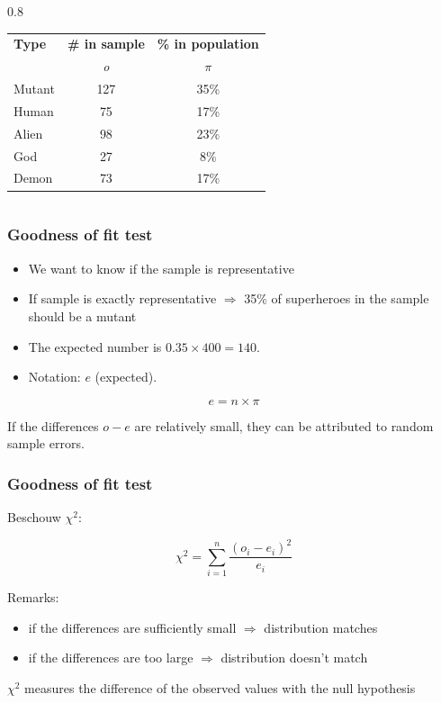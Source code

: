 \documentclass{beamer}
\begin{document}
\begin{frame}
\begin{columns}
    \begin{column} { 0.8 \textwidth}
    \begin{table}
\begin{tabular}{lcc}
	\toprule
	\textbf{Type} & \textbf{\# in sample} & \textbf{\% in population} \\
	              & \emph{o}              & $\pi$                     \\ \midrule
	Mutant        & 127                   & 35\%                      \\
	Human         & 75                    & 17\%                      \\
	Alien         & 98                    & 23\%                      \\
	God           & 27                    & 8\%                       \\
	Demon         & 73                    & 17\%                      \\ \bottomrule
\end{tabular}
\end{table}
    \end{column}
  \end{columns}
\end{frame}

\begin{frame}
  \frametitle{Goodness of fit test}
  
  \begin{itemize}
    \item We want to know if the sample is representative
    \item If sample is exactly representative $\Rightarrow$ 35\% of superheroes in the sample should be a mutant
    \item The expected number is $0.35 \times 400 = 140$.
    \item Notation: $e$ (expected).
  \end{itemize}

  \[ e = n \times \pi \]
  
  If the differences $o - e$ are relatively small, they can be attributed to random sample errors.
\end{frame}

\begin{frame}
  \frametitle{Goodness of fit test}
  Beschouw $\chi^{2}$:

  \[ \chi^{2} = \sum_{i=1}^{n} \frac{(o_{i} - e_{i})^{2}}{e_{i}} \]

  Remarks:
  \begin{itemize}
    \item if the differences are sufficiently small $\Rightarrow$ distribution matches
    \item if the differences are too large $\Rightarrow$ distribution doesn't match
  \end{itemize}
  
  $\chi^{2}$ measures the difference of the observed values with the null hypothesis
\end{frame}
\end{document}
